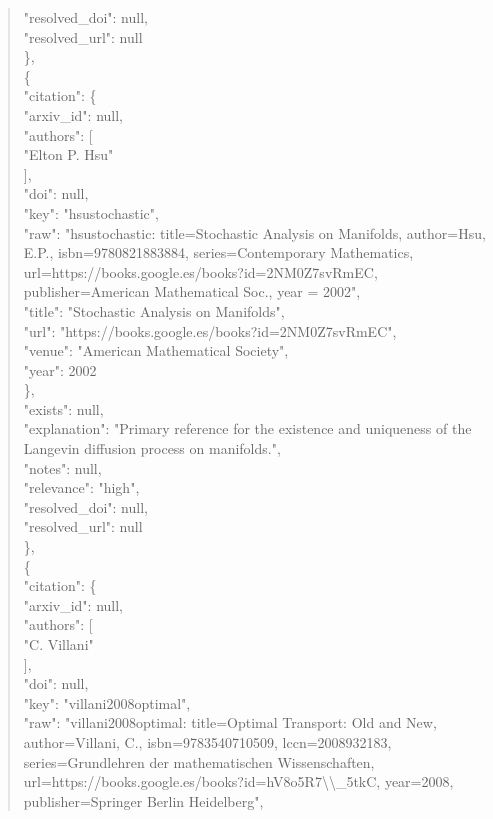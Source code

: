\documentclass[11pt]{article}
\begin{document}
\begin{quote}
      "resolved\_doi": null,\\
      "resolved\_url": null\\
    \},\\
    \{\\
      "citation": \{\\
        "arxiv\_id": null,\\
        "authors": [\\
          "Elton P. Hsu"\\
        ],\\
        "doi": null,\\
        "key": "hsustochastic",\\
        "raw": "hsustochastic: title=Stochastic Analysis on Manifolds, author=Hsu, E.P., isbn=9780821883884, series=Contemporary Mathematics, url=https://books.google.es/books?id=2NM0Z7svRmEC, publisher=American Mathematical Soc., year = 2002",\\
        "title": "Stochastic Analysis on Manifolds",\\
        "url": "https://books.google.es/books?id=2NM0Z7svRmEC",\\
        "venue": "American Mathematical Society",\\
        "year": 2002\\
      \},\\
      "exists": null,\\
      "explanation": "Primary reference for the existence and uniqueness of the Langevin diffusion process on manifolds.",\\
      "notes": null,\\
      "relevance": "high",\\
      "resolved\_doi": null,\\
      "resolved\_url": null\\
    \},\\
    \{\\
      "citation": \{\\
        "arxiv\_id": null,\\
        "authors": [\\
          "C. Villani"\\
        ],\\
        "doi": null,\\
        "key": "villani2008optimal",\\
        "raw": "villani2008optimal: title=Optimal Transport: Old and New, author=Villani, C., isbn=9783540710509, lccn=2008932183, series=Grundlehren der mathematischen Wissenschaften, url=https://books.google.es/books?id=hV8o5R7\textbackslash{}\textbackslash{}\_5tkC, year=2008, publisher=Springer Berlin Heidelberg",\\

\end{quote}
\end{document}

